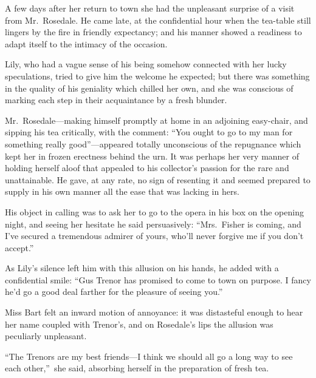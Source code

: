 \documentclass[12pt,a4paper]{book}
\begin{document}
A few days after her return to town she had the unpleasant
surprise of a visit from Mr.\ Rosedale. He came late, at the
confidential hour when the tea-table still lingers by the fire in
friendly expectancy; and his manner showed a readiness to adapt
itself to the intimacy of the occasion.





Lily, who had a vague sense of his being somehow connected
with her lucky speculations, tried to give him the welcome he
expected; but there was something in the quality of his geniality
which chilled her own, and she was conscious of marking each step
in their acquaintance by a fresh blunder.





Mr.\ Rosedale---making himself promptly at home in an adjoining
easy-chair, and sipping his tea critically, with the comment: 
``You ought to go to my man for something really good''---appeared
totally unconscious of the repugnance which kept her in frozen
erectness behind the urn. It was perhaps her very manner of
holding herself aloof that appealed to his collector's passion
for the rare and unattainable. He gave, at any rate, no sign of
resenting it and seemed prepared to supply in his own manner all
the ease that was lacking in hers.





His object in calling was to ask her to go to the opera in his
box on the opening night, and seeing her hesitate he said
persuasively: ``Mrs.\ Fisher is coming, and I've secured a
tremendous admirer of yours, who'll never forgive me if you don't
accept.''





As Lily's silence left him with this allusion on his hands, he
added with a confidential smile: ``Gus Trenor has promised to come
to town on purpose. I fancy he'd go a good deal farther for the
pleasure of seeing you.''





Miss Bart felt an inward motion of annoyance: it was distasteful
enough to hear her name coupled with Trenor's, and on Rosedale's
lips the allusion was peculiarly unpleasant.





``The Trenors are my best friends---I think we should all go a long
way to see each other,''\ she said, absorbing herself in the
preparation of fresh tea.
\end{document}
